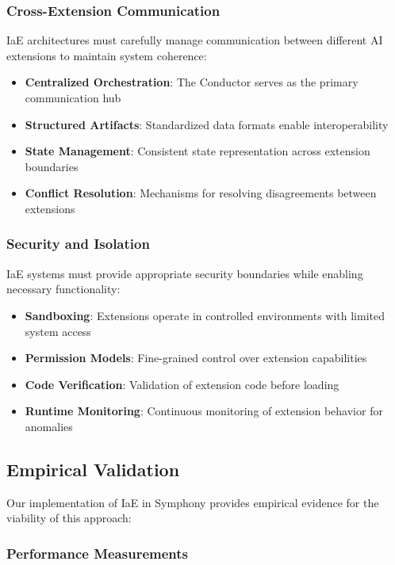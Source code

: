 \subsubsection{Cross-Extension Communication}

IaE architectures must carefully manage communication between different AI extensions to maintain system coherence:

\begin{itemize}
    \item \textbf{Centralized Orchestration}: The Conductor serves as the primary communication hub
    \item \textbf{Structured Artifacts}: Standardized data formats enable interoperability
    \item \textbf{State Management}: Consistent state representation across extension boundaries
    \item \textbf{Conflict Resolution}: Mechanisms for resolving disagreements between extensions
\end{itemize}

\subsubsection{Security and Isolation}

IaE systems must provide appropriate security boundaries while enabling necessary functionality:

\begin{itemize}
    \item \textbf{Sandboxing}: Extensions operate in controlled environments with limited system access
    \item \textbf{Permission Models}: Fine-grained control over extension capabilities
    \item \textbf{Code Verification}: Validation of extension code before loading
    \item \textbf{Runtime Monitoring}: Continuous monitoring of extension behavior for anomalies
\end{itemize}

\subsection{Empirical Validation}

Our implementation of IaE in Symphony provides empirical evidence for the viability of this approach:

\subsubsection{Performance Measurements}

